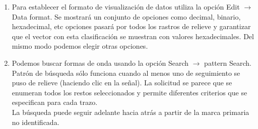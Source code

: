 \documentclass[10pt,graphicx,caption,rotating]{article}
\begin{document}
\begin{enumerate}
\begin{enumerate}
     \item Para establecer el formato de visualización de datos utiliza la opción Edit $\rightarrow$ Data format. Se mostrará un conjunto de opciones como decimal, binario, hexadecimal, etc opciones pasará por todos los rastros de relieve y garantizar que el vector con esta clasificación se muestran con valores hexadecimales. Del mismo modo podemos elegir otras opciones.
     \item Podemos buscar formas de onda usando la opción Search $\rightarrow$ pattern Search. Patrón de búsqueda sólo funciona cuando al menos uno de seguimiento se puso de relieve (haciendo clic en la señal). La solicitud se parece que se enumeran todos los restos seleccionados y permite diferentes criterios que se especifican para cada trazo.\\
La búsqueda puede seguir adelante hacia atrás a partir de la marca primaria no identificada.
    \end{enumerate}
\end{enumerate}
\end{document}
